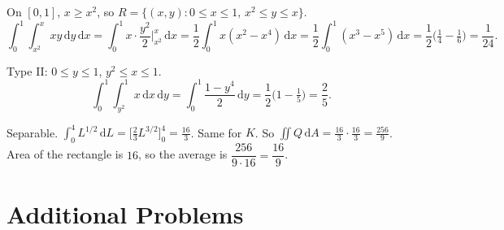 \begin{solutions}
  \item On $[0,1]$, $x\ge x^{2}$, so
        $R=\{(x,y): 0\le x\le 1,\, x^{2}\le y\le x\}$.
        \[
          \int_{0}^{1}\int_{x^{2}}^{x} xy\,\mathrm{d}y\,\mathrm{d}x
            =\int_{0}^{1} x\cdot\frac{y^{2}}{2}\Big|_{x^{2}}^{x}\,\mathrm{d}x
            =\frac{1}{2}\int_{0}^{1} x(x^{2}-x^{4})\,\mathrm{d}x
            =\frac{1}{2}\int_{0}^{1} (x^{3}-x^{5})\,\mathrm{d}x
            =\frac{1}{2}\bigl(\tfrac14-\tfrac16\bigr)=\frac{1}{24} .
        \]

  \item Type II: $0\le y\le 1$, $y^{2}\le x\le 1$.
        \[
          \int_{0}^{1}\int_{y^{2}}^{1} x\,\mathrm{d}x\,\mathrm{d}y
            =\int_{0}^{1} \frac{1-y^{4}}{2}\,\mathrm{d}y
            =\frac{1}{2}\bigl(1-\tfrac15\bigr)=\frac{2}{5} .
        \]

  \item Separable. $\int_{0}^{4} L^{1/2}\,\mathrm{d}L
        =\bigl[\tfrac23 L^{3/2}\bigr]_{0}^{4}=\frac{16}{3}$. Same for
        $K$. So $\iint Q\,\mathrm{d}A=\frac{16}{3}\cdot\frac{16}{3}=\frac{256}{9}$.
        Area of the rectangle is $16$, so the average is
        $\dfrac{256}{9\cdot 16}=\dfrac{16}{9}$.
\end{solutions}

\section{Additional Problems}

